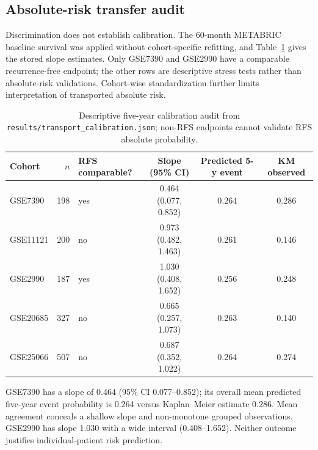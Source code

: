 \subsection{Absolute-risk transfer audit}
Discrimination does not establish calibration. The 60-month METABRIC baseline survival was applied without cohort-specific refitting, and Table~\ref{tab:calibration-audit} gives the stored slope estimates. Only GSE7390 and GSE2990 have a comparable recurrence-free endpoint; the other rows are descriptive stress tests rather than absolute-risk validations. Cohort-wise standardization further limits interpretation of transported absolute risk.
\begin{table}[htbp]\centering\small
\begin{tabular}{lrlccc}\hline
Cohort & $n$ & RFS comparable? & Slope (95\% CI) & Predicted 5-y event & KM observed \\ \hline
GSE7390 & 198 & yes & 0.464 (0.077, 0.852) & 0.264 & 0.286 \\
GSE11121 & 200 & no & 0.973 (0.482, 1.463) & 0.261 & 0.146 \\
GSE2990 & 187 & yes & 1.030 (0.408, 1.652) & 0.256 & 0.248 \\
GSE20685 & 327 & no & 0.665 (0.257, 1.073) & 0.263 & 0.140 \\
GSE25066 & 507 & no & 0.687 (0.352, 1.022) & 0.264 & 0.274 \\
\hline\end{tabular}
\caption{Descriptive five-year calibration audit from \texttt{results/transport\_calibration.json}; non-RFS endpoints cannot validate RFS absolute probability.}\label{tab:calibration-audit}
\end{table}
\par GSE7390 has a slope of 0.464 (95\% CI 0.077--0.852); its overall mean predicted five-year event probability is 0.264 versus Kaplan--Meier estimate 0.286. Mean agreement conceals a shallow slope and non-monotone grouped observations. GSE2990 has slope 1.030 with a wide interval (0.408--1.652). Neither outcome justifies individual-patient risk prediction.
